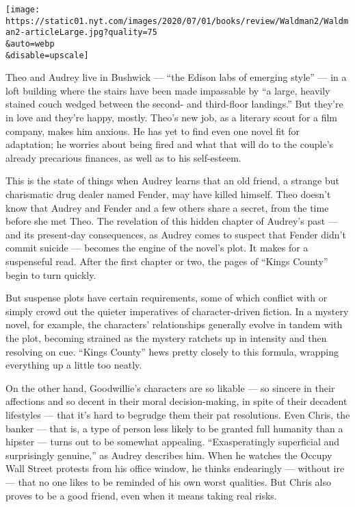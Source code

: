 \texttt{[image: https://static01.nyt.com/images/2020/07/01/books/review/Waldman2/Waldman2-articleLarge.jpg?quality=75\\\&auto=webp\\\&disable=upscale]}

Theo and Audrey live in Bushwick --- ``the Edison labs of emerging
style'' --- in a loft building where the stairs have been made
impassable by ``a large, heavily stained couch wedged between the
second- and third-floor landings.'' But they're in love and they're
happy, mostly. Theo's new job, as a literary scout for a film company,
makes him anxious. He has yet to find even one novel fit for adaptation;
he worries about being fired and what that will do to the couple's
already precarious finances, as well as to his self-esteem.

This is the state of things when Audrey learns that an old friend, a
strange but charismatic drug dealer named Fender, may have killed
himself. Theo doesn't know that Audrey and Fender and a few others share
a secret, from the time before she met Theo. The revelation of this
hidden chapter of Audrey's past --- and its present-day consequences, as
Audrey comes to suspect that Fender didn't commit suicide --- becomes
the engine of the novel's plot. It makes for a suspenseful read. After
the first chapter or two, the pages of ``Kings County'' begin to turn
quickly.

But suspense plots have certain requirements, some of which conflict
with or simply crowd out the quieter imperatives of character-driven
fiction. In a mystery novel, for example, the characters' relationships
generally evolve in tandem with the plot, becoming strained as the
mystery ratchets up in intensity and then resolving on cue. ``Kings
County'' hews pretty closely to this formula, wrapping everything up a
little too neatly.

On the other hand, Goodwillie's characters are so likable --- so sincere
in their affections and so decent in their moral decision-making, in
spite of their decadent lifestyles --- that it's hard to begrudge them
their pat resolutions. Even Chris, the banker --- that is, a type of
person less likely to be granted full humanity than a hipster --- turns
out to be somewhat appealing. ``Exasperatingly superficial and
surprisingly genuine,'' as Audrey describes him. When he watches the
Occupy Wall Street protests from his office window, he thinks
endearingly --- without ire --- that no one likes to be reminded of his
own worst qualities. But Chris also proves to be a good friend, even
when it means taking real risks.

